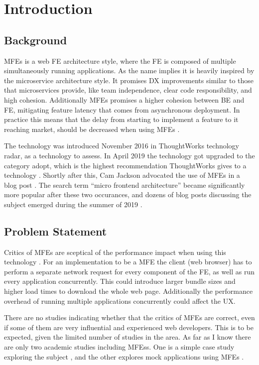 
\chapter{Introduction}

\section{Background}
\acp{MFE} is a web \ac{FE} architecture style, where the \ac{FE} is composed of multiple simultaneously running applications. As the name implies it is heavily inspired by the microservice architecture style. It promises \ac{DX} improvements similar to those that microservices provide, like team independence, clear code responsibility, and high cohesion. Additionally \acp{MFE} promises a higher cohesion between \ac{BE} and \ac{FE}, mitigating feature latency that comes from asynchronous deployment. In practice this means that the delay from starting to implement a feature to it reaching market, should be decreased when using \acp{MFE} \cite{Celik}.

The technology was introduced November 2016 in ThoughtWorks technology radar, as a technology to assess. In April 2019 the technology got upgraded to the category adopt, which is the highest recommendation ThoughtWorks gives to a technology \cite{ThoughtWorks}. Shortly after this, Cam Jackson \citeauthor{Jackson2019} advocated the use of \acp{MFE} in a blog post \cite{Jackson2019}. The search term ``micro frontend architecture'' became significantly more popular after these two occurances, and dozens of blog posts discussing the subject emerged during the summer of 2019 \cite{Google}.

\section{Problem Statement}
Critics of \acp{MFE} are sceptical of the performance impact when using this technology \cite{LarkinTheLarkInn2019,Evakalliojevakallio2019}. For an implementation to be a \ac{MFE} the client (web browser) has to perform a separate network request for every component of the \ac{FE}, as well as run every application concurrently. This could introduce larger bundle sizes and higher load times to download the whole web page. Additionally the performance overhead of running multiple applications concurrently could affect the \ac{UX}.

There are no studies indicating whether that the critics of \acp{MFE} are correct, even if some of them are very influential and experienced web developers. This is to be expected, given the limited number of studies in the area. As far as I know there are only two academic studies including \acp{MFE}s. One is a simple case study exploring the subject \cite{Yang2019}, and the other explores mock applications using \acp{MFE} \cite{baumann2019micro}.

